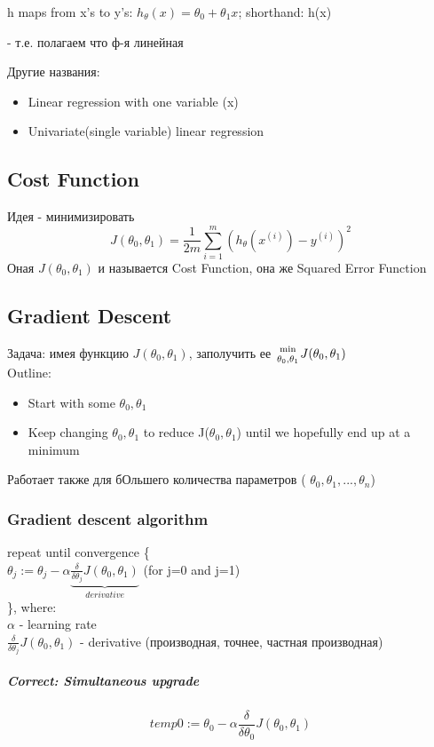 \documentclass{scrartcl}
\begin{document}
h maps from x's to y's: $h_\theta(x)=\theta_0 + \theta_1x$; shorthand:
h(x)

- т.е. полагаем что ф-я линейная

Другие названия:
\begin{itemize}
\item Linear regression with one variable (x)
\item Univariate(single variable) linear regression
\end{itemize}
\subsection {Cost Function}
\label{2-2}
Идея - минимизировать \[ J(\theta_0, \theta_1) = \frac{1}{2m}
\sum_{i=1}^m\left( h_\theta (x^{(i)}) - y^{(i)} \right)^2
\]
Оная $J(\theta_0, \theta_1)$ и называется Cost Function, она же
Squared Error Function

\subsection {Gradient Descent}
\label {2-5}
Задача: имея функцию $J(\theta_0, \theta_1)$, заполучить ее
${\min \atop \theta_0, \theta_1} J(\theta_0, \theta_1)$ \\
Outline:
\begin {itemize}
\item Start with some $\theta_0, \theta_1$
\item Keep changing $\theta_0, \theta_1$ to reduce J($\theta_0,
  \theta_1$) until we hopefully end up at a minimum
\end{itemize}
Работает также для бОльшего количества параметров ( $\theta_0,
\theta_1,..., \theta_n$)
\subsubsection {Gradient descent algorithm}
repeat until convergence \{ \\
$\theta_j := \theta_j - {\alpha} \underbrace{ \frac {\delta}{\delta
    \theta_j} J(\theta_0,
  \theta_1)}_{derivative}$ (for j=0 and j=1) \\
\}, where: \\
$\alpha$ - learning rate \\
$\frac {\delta}{\delta \theta_j} J(\theta_0, \theta_1)$ - derivative
(производная, точнее, частная производная)

\subparagraph {Correct: Simultaneous upgrade}

\[temp0 := \theta_0 - \alpha \frac {\delta}{\delta \theta_0}
J(\theta_0, \theta_1)\]
\end{document}

